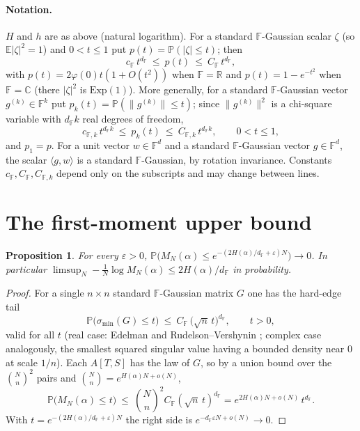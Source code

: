\documentclass[11pt,reqno]{amsart}
\theoremstyle{plain}
\newtheorem{proposition}[theorem]{Proposition}
\theoremstyle{definition}
\theoremstyle{remark}
\newcommand{\R}{\mathbb{R}}
\newcommand{\C}{\mathbb{C}}
\newcommand{\F}{\mathbb{F}}
\newcommand{\PP}{\mathbb{P}}
\newcommand{\EE}{\mathbb{E}}
\newcommand{\smin}{\sigma_{\min}}
\newcommand{\dF}{d_{\F}}
\begin{document}
\paragraph{Notation.}
$H$ and $h$ are as above (natural logarithm). For a standard $\F$-Gaussian scalar $\zeta$ (so
$\EE|\zeta|^2=1$) and $0<t\le1$ put $p(t)=\PP(|\zeta|\le t)$; then
\begin{equation}\label{eq:pball}
  c_\F\,t^{\dF}\ \le\ p(t)\ \le\ C_\F\,t^{\dF},
\end{equation}
with $p(t)=2\varphi(0)t(1+O(t^2))$ when $\F=\R$ and $p(t)=1-e^{-t^2}$ when $\F=\C$ (there $|\zeta|^2$ is
$\mathrm{Exp}(1)$). More generally, for a standard $\F$-Gaussian vector $g^{(k)}\in\F^k$ put
$p_k(t)=\PP(\|g^{(k)}\|\le t)$; since $\|g^{(k)}\|^2$ is a chi-square variable with $\dF k$ real
degrees of freedom,
\begin{equation}\label{eq:pkball}
  c_{\F,k}\,t^{\dF k}\ \le\ p_k(t)\ \le\ C_{\F,k}\,t^{\dF k},\qquad 0<t\le1,
\end{equation}
and $p_1=p$. For a unit vector $w\in\F^d$ and a standard $\F$-Gaussian vector $g\in\F^d$, the
scalar $\langle g,w\rangle$ is a standard $\F$-Gaussian, by rotation invariance. Constants
$c_\F,C_\F,C_{\F,k}$ depend only on the subscripts and may change between lines.

\section{The first-moment upper bound}\label{sec:upper}
\begin{proposition}\label{prop:upper}
For every $\varepsilon>0$, $\PP\bigl(M_N(\alpha)\le e^{-(2H(\alpha)/\dF+\varepsilon)N}\bigr)\to0$. In
particular $\limsup_N-\tfrac1N\log M_N(\alpha)\le 2H(\alpha)/\dF$ in probability.
\end{proposition}
\begin{proof}
For a single $n\times n$ standard $\F$-Gaussian matrix $G$ one has the hard-edge tail
\begin{equation}\label{eq:hardedge}
  \PP\bigl(\smin(G)\le t\bigr)\ \le\ C_\F\,\bigl(\sqrt n\,t\bigr)^{\dF},\qquad t>0,
\end{equation}
valid for all $t$ (real case: Edelman \cite{edelman} and Rudelson--Vershynin \cite{rv}; complex case
analogously, the smallest squared singular value having a bounded density near $0$ at scale $1/n$).
Each $A[T,S]$ has the law of $G$, so by a union bound over the $\binom Nn^2$ pairs and $\binom
Nn=e^{H(\alpha)N+o(N)}$,
\[
  \PP\bigl(M_N(\alpha)\le t\bigr)\ \le\ \binom Nn^2 C_\F(\sqrt n\,t)^{\dF}
  = e^{2H(\alpha)N+o(N)}\,t^{\dF}.
\]
With $t=e^{-(2H(\alpha)/\dF+\varepsilon)N}$ the right side is $e^{-\dF\varepsilon N+o(N)}\to0$.
\end{proof}
\end{document}
